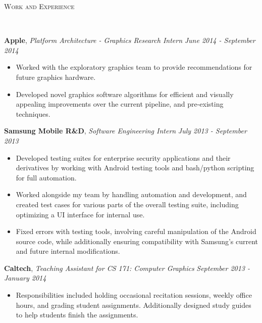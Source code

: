 \documentclass[9pt]{article}
\newenvironment{changemargin}[2]{%
  \begin{list}{}{%
    \setlength{\topsep}{0pt}%
    \setlength{\leftmargin}{#1}%
    \setlength{\rightmargin}{#2}%
    \setlength{\listparindent}{\parindent}%
    \setlength{\itemindent}{\parindent}%
    \setlength{\parsep}{\parskip}%
  }%
  \item[]}{\end{list}
}
\newcommand{\lineover}{
	\begin{changemargin}{-0.05in}{-0.05in}
		\vspace*{-8pt}
		\hrulefill \\
		\vspace*{-2pt}
	\end{changemargin}
}
\newcommand{\header}[1]{
	\begin{changemargin}{-0.5in}{-0.5in}
		\scshape{#1}\\
  	\lineover
	\end{changemargin}
}
\newenvironment{body} {
	\vspace*{-16pt}
	\begin{changemargin}{-0.25in}{-0.5in}
  }	
	{\end{changemargin}
}
\begin{document}
\header{Work and Experience}
\begin{body}
	\vspace{14pt}
	\textbf{Apple}, \emph{Platform Architecture - Graphics Research Intern} \hfill \emph{June 2014 - September 2014}\\
	\vspace*{-3pt}
	\begin{itemize} \itemsep -0pt %
	\item Worked with the exploratory graphics team to provide recommendations for future graphics hardware.
	\item Developed novel graphics software algorithms for efficient and visually appealing improvements over the current pipeline, and pre-existing techniques.
	\end{itemize}
	\vspace*{-3pt}
	\textbf{Samsung Mobile R\&D}, \emph{Software Engineering Intern} \hfill \emph{July 2013 - September 2013}\\
	\vspace*{-4pt}
	\begin{itemize} \itemsep -0pt %
	\item Developed testing suites for enterprise security applications and their derivatives by working with Android testing tools and bash/python scripting for full automation.
	\item Worked alongside my team by handling automation and development, and created test cases for various parts of the overall testing suite, including optimizing a UI interface for internal use.
	\item Fixed errors with testing tools, involving careful manipulation of the Android source code, while additionally ensuring compatibility with Samsung's current and future internal modifications.
	\end{itemize}
	\vspace*{-3pt}
	\textbf{Caltech}, \emph{Teaching Assistant for CS 171: Computer Graphics} \hfill \emph{September 2013 - January 2014}\\
	\vspace*{-3pt}
	\begin{itemize} \itemsep -0pt %
	\item Responsibilities included holding occasional recitation sessions, weekly office hours, and grading student assignments. Additionally designed study guides to help students finish the assignments.

\end{itemize}
\end{body}
\end{document}
